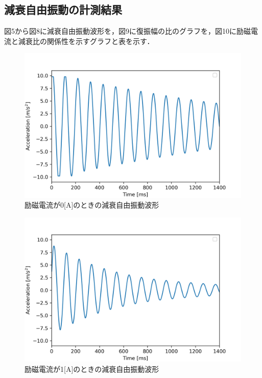 \documentclass[a4paper,10.5pt]{jsarticle}
\begin{document}
\subsection{減衰自由振動の計測結果}
図5から図8に減衰自由振動波形を，図9に復振幅の比のグラフを，図10に励磁電流と減衰比の関係性を示すグラフと表を示す．
\newpage
\begin{figure}[h]
  \centering
  \includegraphics[width=13cm]{damp0.png}
  \caption{励磁電流が0[A]のときの減衰自由振動波形}
\end{figure}
\begin{figure}[h]
  \centering
  \includegraphics[width=13cm]{damp1.png}
  \caption{励磁電流が1[A]のときの減衰自由振動波形}
\end{figure}
\newpage
\end{document}
